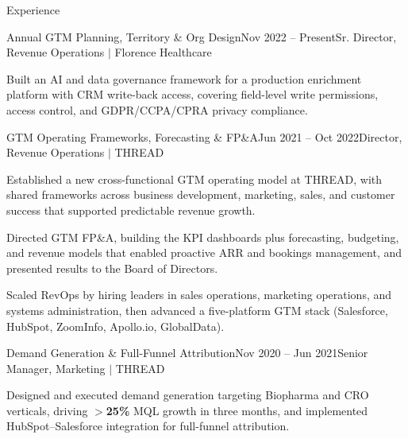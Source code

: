 \documentclass{resume}
\begin{document}
\begin{rSection}{Experience}
\begin{rSubsection}{Annual GTM Planning, Territory \& Org Design}{\textcolor{black!60}{Nov 2022 -- Present}}{Sr. Director, Revenue Operations $\vert$ Florence Healthcare}{}
\item Built an AI and data governance framework for a production enrichment platform with CRM write-back access, covering field-level write permissions, access control, and GDPR/CCPA/CPRA privacy compliance.
\end{rSubsection}

\begin{rSubsection}{GTM Operating Frameworks, Forecasting \& FP\&A}{\textcolor{black!60}{Jun 2021 -- Oct 2022}}{Director, Revenue Operations $\vert$ THREAD}{}
\item Established a new cross-functional GTM operating model at THREAD, with shared frameworks across business development, marketing, sales, and customer success that supported predictable revenue growth.
\item Directed GTM FP\&A, building the KPI dashboards plus forecasting, budgeting, and revenue models that enabled proactive ARR and bookings management, and presented results to the Board of Directors.
\item Scaled RevOps by hiring leaders in sales operations, marketing operations, and systems administration, then advanced a five-platform GTM stack (Salesforce, HubSpot, ZoomInfo, Apollo.io, GlobalData).
\end{rSubsection}

\begin{rSubsection}{Demand Generation \& Full-Funnel Attribution}{\textcolor{black!60}{Nov 2020 -- Jun 2021}}{Senior Manager, Marketing $\vert$ THREAD}{}
\item Designed and executed demand generation targeting Biopharma and CRO verticals, driving $>$\textbf{25\%} MQL growth in three months, and implemented HubSpot--Salesforce integration for full-funnel attribution.
\end{rSubsection}


\end{rSection}
\end{document}
